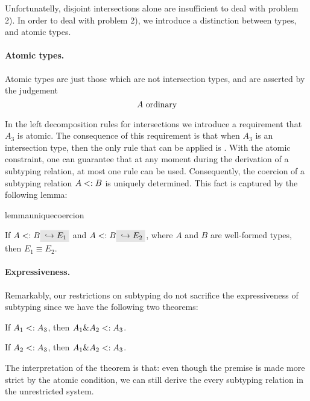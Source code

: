 Unfortunatelly, disjoint intersections alone are insufficient to deal with problem 2).
In order to deal with problem 2), we introduce a distinction between types, and atomic types.

\paragraph{Atomic types.} Atomic types are just those which are not intersection
types, and are asserted by the judgement \[ A \ \textnormal{ordinary} \]

In the left decomposition rules for intersections we introduce a requirement that
$A_3$ is atomic. The consequence of this requirement is that when $A_3$ is an intersection type, then
the only rule that can be applied is .
With the atomic constraint, one can guarantee that at any moment during the
derivation of a subtyping relation, at most one rule can be used.
Consequently, the coercion of a subtyping relation $A <: B$ is uniquely determined.
This fact is captured by the following lemma:

\begin{restatable}{lemma}{uniquecoercion}
  \label{lemma:unique-coercion}

  If $A \subtype B \yields {E_1}$ and $A \subtype B \yields {E_2}$, where $A$
  and $B$ are well-formed types, then $E_1 \equiv E_2$.
\end{restatable}

\paragraph{Expressiveness.}
Remarkably, our restrictions on subtyping do not sacrifice the expressiveness of
subtyping since we have the following two theorems:
\begin{theorem}
  If $A_1 <: A_3$, then $A_1 \& A_2 <: A_3$.
\end{theorem}
\begin{theorem}
If $A_2 <: A_3$, then $A_1 \& A_2 <: A_3$.
\end{theorem}

The interpretation of the theorem is that: even though the premise is made more
strict by the atomic condition, we can still derive the every subtyping relation
in the unrestricted system.

